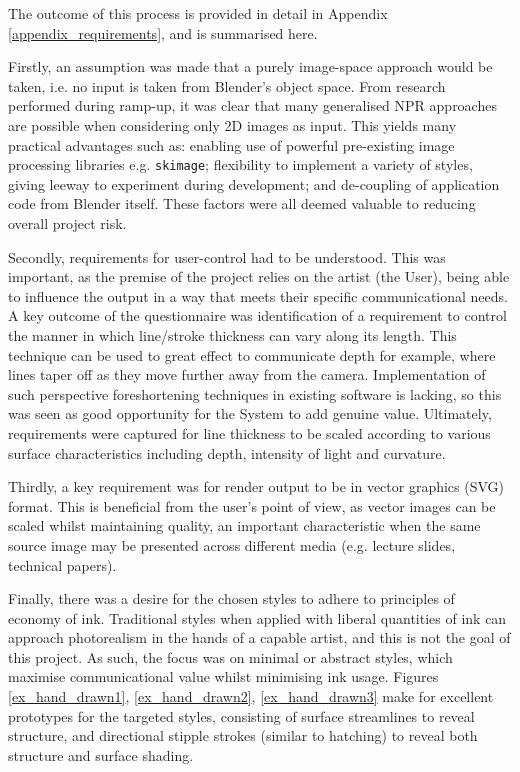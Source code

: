 The outcome of this process is provided in detail in Appendix \ref{appendix_requirements}, and is summarised here.

Firstly, an assumption was made that a purely image-space approach would be taken, i.e. no input is taken from Blender's object space.
From research performed during ramp-up, it was clear that many generalised NPR approaches are possible when considering only 2D images as input.
This yields many practical advantages such as: enabling use of powerful pre-existing image processing libraries e.g. \texttt{skimage}; flexibility to implement a variety of styles, giving leeway to experiment during development; and de-coupling of application code from Blender itself.
These factors were all deemed valuable to reducing overall project risk.

Secondly, requirements for user-control had to be understood.
This was important, as the premise of the project relies on the artist (the User), being able to influence the output in a way that meets their specific communicational needs.
A key outcome of the questionnaire was identification of a requirement to control the manner in which line/stroke thickness can vary along its length.
This technique can be used to great effect to communicate depth for example, where lines taper off as they move further away from the camera.
Implementation of such perspective foreshortening techniques in existing software is lacking, so this was seen as good opportunity for the System to add genuine value.
Ultimately, requirements were captured for line thickness to be scaled according to various surface characteristics including depth, intensity of light and curvature.

Thirdly, a key requirement was for render output to be in vector graphics (SVG) format.
This is beneficial from the user's point of view, as vector images can be scaled whilst maintaining quality, an important characteristic when the same source image may be presented across different media (e.g. lecture slides, technical papers).

Finally, there was a desire for the chosen styles to adhere to principles of economy of ink.
Traditional styles when applied with liberal quantities of ink can approach photorealism in the hands of a capable artist, and this is not the goal of this project.
As such, the focus was on minimal or abstract styles, which maximise communicational value whilst minimising ink usage.
Figures \ref{ex_hand_drawn1}, \ref{ex_hand_drawn2}, \ref{ex_hand_drawn3} make for excellent prototypes for the targeted styles, consisting of surface streamlines to reveal structure, and directional stipple strokes (similar to hatching) to reveal both structure and surface shading.

